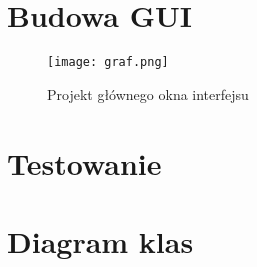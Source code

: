 \documentclass[]{article}
\begin{document}
\section{Budowa GUI}\label{header-n279}

\begin{figure}[h!]
\begin{center}
  \texttt{[image: graf.png]}
  \end{center}
  \caption{Projekt głównego okna interfejsu}
  \label{fig:graf}
\end{figure}

\section{Testowanie}\label{header-n281}

\section{Diagram klas}\label{header-n283}
\end{document}
